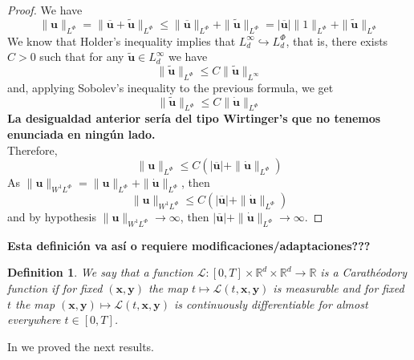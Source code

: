 \documentclass[twoside]{article}
\newtheorem{defi}[thm]{Definition}
\theoremstyle{remark}
\newcommand{\orlnor}{\|_{L^{\Phi}}}
\newcommand{\lphi}{L^{\Phi}}
\newcommand{\sobnor}{\|_{W^{1}\lphi}}
\renewcommand{\b}[1]{\boldsymbol{#1}}
\renewcommand{\leq}{\leqslant}
\begin{document}
\begin{proof}
We have
\[
\|\b{u}\orlnor=
\|\b{\overline u}+\b{\tilde{u}}\orlnor\leq 
\|\b{\overline u}\orlnor+\|\b{\tilde{u}}\orlnor=
|\b{\overline u}|\|1\orlnor+\|\b{\tilde{u}}\orlnor
\]
We know that Holder's inequality implies that $L^{\infty}_d\hookrightarrow\lphi_d$, that is,
there exists $C>0$ such that for any $\b{\tilde{u}}\in L^{\infty}_d$ we have 
\[
\|\b{\tilde{u}}\orlnor
\leq 
C
\|\b{\tilde{u}}\|_{L^{\infty}}
\]
and, applying  Sobolev's inequality to the previous formula,  we get  
\[
\|\b{\tilde{u}}\orlnor
\leq 
C\|\b{\dot{u}}\orlnor
\]
{\bf La desigualdad anterior ser\'ia del tipo Wirtinger's que no tenemos enunciada en ning\'un lado.}
\\
Therefore, 
\begin{equation}
\|\b{u}\orlnor\leq 
C(|\b{\overline u}|+\|\b{\dot{u}}\orlnor)
\end{equation}
As 
$\|\b{u}\sobnor=\|\b{u}\orlnor+\|\b{\dot{u}}\orlnor$, then 
\[
\|\b{u}\sobnor\leq
C(|\b{\overline u}|+\|\b{\dot{u}}\orlnor)
\]
 and by hypothesis $\|\b{u}\sobnor\to \infty$, then 
$|\b{\overline u}|+\|\b{\dot{u}}\orlnor\to \infty$.
\end{proof}

{\bf Esta definici\'on va as\'i o requiere modificaciones/adaptaciones???}

\begin{defi} We say that a function $\mathcal{L}:[0,T]\times \mathbb{R}^d \times \mathbb{R}^d \rightarrow \mathbb{R}$ is a Carath\'eodory function if for fixed $(\b{x},\b{y})$
the map $t \mapsto \mathcal{L}(t, \b{x},\b{y})$ is measurable  and for fixed $t$ the map  $(\b{x},\b{y}) \mapsto \mathcal{L}(t, \b{x}, \b{y})$ is continuously differentiable for almost everywhere $t\in [0,T]$.
\end{defi}

In \cite{ABGMS2015} we proved the next results.
\end{document}
